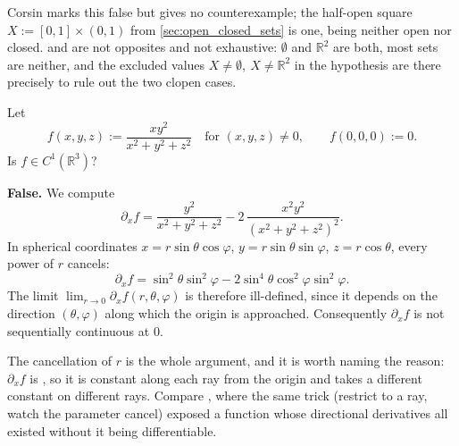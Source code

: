 \begin{ainote}
Corsin marks this false but gives no counterexample; the half-open square
$X := [0,1] \times (0,1)$ from \cref{sec:open_closed_sets} is one, being neither open
nor closed.  and  are not opposites and not exhaustive: $\emptyset$ and
$\mathbb{R}^2$ are both, most sets are neither, and the excluded values
$X \neq \emptyset,\ X \neq \mathbb{R}^2$ in the hypothesis are there precisely to rule out the
two clopen cases.
\end{ainote}

\begin{question}
\label{q:quiz_q4}
Let
\[f(x,y,z) := \frac{xy^2}{x^2+y^2+z^2} \quad \text{for } (x,y,z) \neq 0, \qquad f(0,0,0) := 0.\]
Is $f \in C^1(\mathbb{R}^3)$?
\end{question}

\begin{answer}
\textbf{False.} We compute
\[\partial_xf = \frac{y^2}{x^2+y^2+z^2} - 2\,\frac{x^2y^2}{(x^2+y^2+z^2)^2}.\]
In spherical coordinates $x = r\sin\theta\cos\varphi$, $y = r\sin\theta\sin\varphi$,
$z = r\cos\theta$, every power of $r$ cancels:
\[\partial_xf = \sin^2\theta\sin^2\varphi - 2\sin^4\theta\cos^2\varphi\sin^2\varphi.\]
The limit $\lim_{r\to0}\partial_xf(r,\theta,\varphi)$ is therefore ill-defined, since it depends
on the direction $(\theta,\varphi)$ along which the origin is approached. Consequently
$\partial_xf$ is not sequentially continuous at $0$.
\end{answer}

\begin{ainote}
The cancellation of $r$ is the whole argument, and it is worth naming the reason: $\partial_xf$
is , so it is constant along each ray from the origin and
takes a different constant on different rays. Compare
, where the same trick (restrict to a ray, watch the
parameter cancel) exposed a function whose directional derivatives all existed without it being
differentiable.
\end{ainote}

